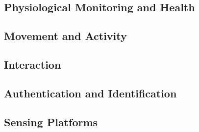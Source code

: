 \subsection{Physiological Monitoring and Health}
\subsection{Movement and Activity}
\subsection{Interaction}
\subsection{Authentication and Identification}

\subsection{Sensing Platforms}







